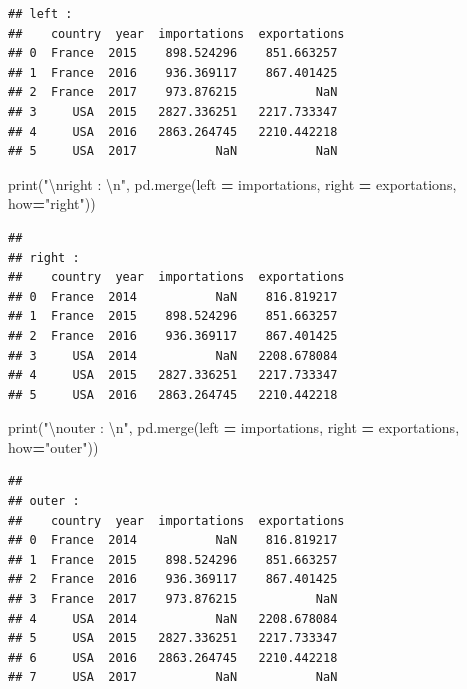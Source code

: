 \documentclass[
  12pt,
]{book}
\newenvironment{Shaded}{\begin{snugshade}}{\end{snugshade}}
\newcommand{\BuiltInTok}[1]{#1}
\newcommand{\CharTok}[1]{\textcolor[rgb]{0.31,0.60,0.02}{#1}}
\newcommand{\NormalTok}[1]{#1}
\newcommand{\OperatorTok}[1]{\textcolor[rgb]{0.81,0.36,0.00}{\textbf{#1}}}
\newcommand{\StringTok}[1]{\textcolor[rgb]{0.31,0.60,0.02}{#1}}
\numberwithin{equation}{section}
\numberwithin{countremarque}{section}
\begin{document}
\begin{lstlisting}
## left : 
##    country  year  importations  exportations
## 0  France  2015    898.524296    851.663257
## 1  France  2016    936.369117    867.401425
## 2  France  2017    973.876215           NaN
## 3     USA  2015   2827.336251   2217.733347
## 4     USA  2016   2863.264745   2210.442218
## 5     USA  2017           NaN           NaN
\end{lstlisting}

\begin{Shaded}
\begin{Highlighting}[]
\BuiltInTok{print}\NormalTok{(}\StringTok{"}\CharTok{\textbackslash{}n}\StringTok{right : }\CharTok{\textbackslash{}n}\StringTok{"}\NormalTok{, pd.merge(left }\OperatorTok{=}\NormalTok{ importations, right }\OperatorTok{=}\NormalTok{ exportations, how}\OperatorTok{=}\StringTok{"right"}\NormalTok{))}
\end{Highlighting}
\end{Shaded}

\begin{lstlisting}
## 
## right : 
##    country  year  importations  exportations
## 0  France  2014           NaN    816.819217
## 1  France  2015    898.524296    851.663257
## 2  France  2016    936.369117    867.401425
## 3     USA  2014           NaN   2208.678084
## 4     USA  2015   2827.336251   2217.733347
## 5     USA  2016   2863.264745   2210.442218
\end{lstlisting}

\begin{Shaded}
\begin{Highlighting}[]
\BuiltInTok{print}\NormalTok{(}\StringTok{"}\CharTok{\textbackslash{}n}\StringTok{outer : }\CharTok{\textbackslash{}n}\StringTok{"}\NormalTok{, pd.merge(left }\OperatorTok{=}\NormalTok{ importations, right }\OperatorTok{=}\NormalTok{ exportations, how}\OperatorTok{=}\StringTok{"outer"}\NormalTok{))}
\end{Highlighting}
\end{Shaded}

\begin{lstlisting}
## 
## outer : 
##    country  year  importations  exportations
## 0  France  2014           NaN    816.819217
## 1  France  2015    898.524296    851.663257
## 2  France  2016    936.369117    867.401425
## 3  France  2017    973.876215           NaN
## 4     USA  2014           NaN   2208.678084
## 5     USA  2015   2827.336251   2217.733347
## 6     USA  2016   2863.264745   2210.442218
## 7     USA  2017           NaN           NaN
\end{lstlisting}
\end{document}
